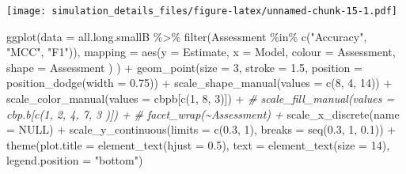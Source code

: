 \documentclass[
]{article}
\newenvironment{Shaded}{\begin{snugshade}}{\end{snugshade}}
\newcommand{\AttributeTok}[1]{\textcolor[rgb]{0.77,0.63,0.00}{#1}}
\newcommand{\CommentTok}[1]{\textcolor[rgb]{0.56,0.35,0.01}{\textit{#1}}}
\newcommand{\ConstantTok}[1]{\textcolor[rgb]{0.00,0.00,0.00}{#1}}
\newcommand{\DecValTok}[1]{\textcolor[rgb]{0.00,0.00,0.81}{#1}}
\newcommand{\FloatTok}[1]{\textcolor[rgb]{0.00,0.00,0.81}{#1}}
\newcommand{\FunctionTok}[1]{\textcolor[rgb]{0.00,0.00,0.00}{#1}}
\newcommand{\NormalTok}[1]{#1}
\newcommand{\SpecialCharTok}[1]{\textcolor[rgb]{0.00,0.00,0.00}{#1}}
\newcommand{\StringTok}[1]{\textcolor[rgb]{0.31,0.60,0.02}{#1}}
\begin{document}
\texttt{[image: simulation\_details\_files/figure-latex/unnamed-chunk-15-1.pdf]}

\begin{Shaded}
\begin{Highlighting}[]
\FunctionTok{ggplot}\NormalTok{(}\AttributeTok{data =}\NormalTok{ all.long.smallB }\SpecialCharTok{\%\textgreater{}\%} 
         \FunctionTok{filter}\NormalTok{(Assessment }\SpecialCharTok{\%in\%} \FunctionTok{c}\NormalTok{(}\StringTok{"Accuracy"}\NormalTok{, }\StringTok{"MCC"}\NormalTok{, }\StringTok{"F1"}\NormalTok{)),}
       \AttributeTok{mapping =} \FunctionTok{aes}\NormalTok{(}\AttributeTok{y =}\NormalTok{ Estimate,}
                     \AttributeTok{x =}\NormalTok{ Model, }
                     \AttributeTok{colour =}\NormalTok{ Assessment,}
                     \AttributeTok{shape =}\NormalTok{ Assessment}
\NormalTok{                     )}
\NormalTok{       ) }\SpecialCharTok{+}
  \FunctionTok{geom\_point}\NormalTok{(}\AttributeTok{size =} \DecValTok{3}\NormalTok{, }\AttributeTok{stroke =} \FloatTok{1.5}\NormalTok{,}
             \AttributeTok{position =} \FunctionTok{position\_dodge}\NormalTok{(}\AttributeTok{width =} \FloatTok{0.75}\NormalTok{)) }\SpecialCharTok{+}
  \FunctionTok{scale\_shape\_manual}\NormalTok{(}\AttributeTok{values =} \FunctionTok{c}\NormalTok{(}\DecValTok{8}\NormalTok{, }\DecValTok{4}\NormalTok{, }\DecValTok{14}\NormalTok{)) }\SpecialCharTok{+}
  \FunctionTok{scale\_color\_manual}\NormalTok{(}\AttributeTok{values =}\NormalTok{ cbpb[}\FunctionTok{c}\NormalTok{(}\DecValTok{1}\NormalTok{, }\DecValTok{8}\NormalTok{, }\DecValTok{3}\NormalTok{)]) }\SpecialCharTok{+}
  \CommentTok{\# scale\_fill\_manual(values = cbp.b[c(1, 2, 4, 7, 3 )]) +}
  \CommentTok{\# facet\_wrap(\textasciitilde{}Assessment) +}
  \FunctionTok{scale\_x\_discrete}\NormalTok{(}\AttributeTok{name =} \ConstantTok{NULL}\NormalTok{) }\SpecialCharTok{+}
  \FunctionTok{scale\_y\_continuous}\NormalTok{(}\AttributeTok{limits =} \FunctionTok{c}\NormalTok{(}\FloatTok{0.3}\NormalTok{, }\DecValTok{1}\NormalTok{),}
                     \AttributeTok{breaks =} \FunctionTok{seq}\NormalTok{(}\FloatTok{0.3}\NormalTok{, }\DecValTok{1}\NormalTok{, }\FloatTok{0.1}\NormalTok{)) }\SpecialCharTok{+}
  \FunctionTok{theme}\NormalTok{(}\AttributeTok{plot.title =} \FunctionTok{element\_text}\NormalTok{(}\AttributeTok{hjust =} \FloatTok{0.5}\NormalTok{), }
        \AttributeTok{text =} \FunctionTok{element\_text}\NormalTok{(}\AttributeTok{size =} \DecValTok{14}\NormalTok{),}
        \AttributeTok{legend.position =} \StringTok{"bottom"}\NormalTok{)}
\end{Highlighting}
\end{Shaded}
\end{document}
